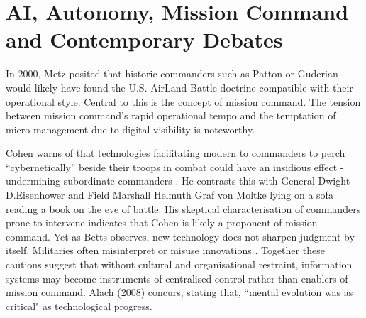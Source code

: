 \section{AI, Autonomy, Mission Command and Contemporary Debates} 
In 2000, Metz  posited that historic commanders such as Patton or Guderian would likely have found the U.S. AirLand Battle doctrine compatible with their operational style\nocite{Metz_2000}. Central to this is the concept of mission command. The tension between mission command's rapid operational tempo and the temptation of micro-management due to digital visibility is noteworthy.

Cohen warns of that technologies facilitating modern to commanders to perch ``cybernetically'' beside their troops in combat could have an insidious effect - undermining subordinate commanders \parencite{COHEN_1996}. He contrasts this with General Dwight D.Eisenhower and Field Marshall Helmuth Graf von Moltke lying on a sofa reading a book on the eve of battle. His skeptical characterisation of commanders prone to intervene indicates that Cohen is likely a proponent of mission command. Yet as Betts observes, new technology does not sharpen judgment by itself. Militaries often misinterpret or misuse innovations \parencite{BETTS_1996}. Together these cautions suggest that without cultural and organisational restraint, information systems may become instruments of centralised control rather than enablers of mission command. Alach (2008) concurs, stating that, ``mental evolution was as critical" as technological progress\nocite{ALACH_2008}.

